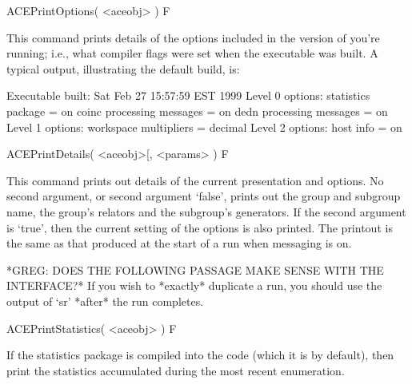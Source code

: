 \beginitems

% 

\>ACEPrintOptions( <aceobj> ) F

This command prints details of the options included  in the version of
{\ACE} you're  running; i.e.,  what compiler flags  were set  when the
executable  was built.   A  typical output,  illustrating the  default
build, is:

\begintt
Executable built:
  Sat Feb 27 15:57:59 EST 1999
Level 0 options:
  statistics package = on
  coinc processing messages = on
  dedn processing messages = on
Level 1 options:
  workspace multipliers = decimal
Level 2 options:
  host info = on
\endtt


\>ACEPrintDetails( <aceobj>[, <params> ) F

This  command  prints out  details  of  the  current presentation  and
options.  No second argument, or second argument `false', prints out
the group
and subgroup name, the group's relators and the subgroup's generators.
If the second argument is `true', then  the current setting of the
options is
also printed.  The printout is the  same as that produced at the start
of a run when messaging is on.


*GREG: DOES THE FOLLOWING PASSAGE MAKE SENSE WITH THE INTERFACE?*
If you wish to *exactly* duplicate a run, you should use the output
of `sr' *after* the run completes.


\>ACEPrintStatistics( <aceobj> ) F

If the statistics package is compiled into the code (which it is by
default),
then print the statistics accumulated during the most recent enumeration.

\enditems


